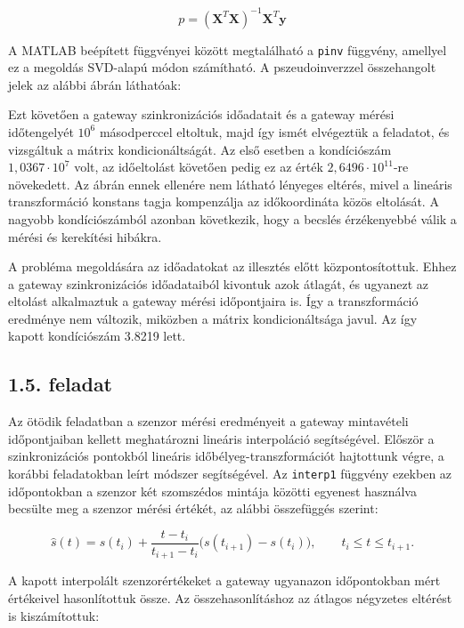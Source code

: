 \documentclass[12pt,a4paper]{article}
\newcommand{\feladat}[1]{%
\phantomsection
\subsection*{#1. feladat}%
\addcontentsline{toc}{subsection}{#1. feladat}%
}
\begin{document}
\begin{equation}
    p = (\textbf{X}^T\textbf{X})^{-1}\textbf{X}^T\textbf{y}
\end{equation}

A MATLAB beépített függvényei között megtalálható a \texttt{pinv} függvény, amellyel ez a megoldás SVD-alapú módon számítható. A pszeudoinverzzel összehangolt jelek az alábbi ábrán láthatóak:


Ezt követően a gateway szinkronizációs időadatait és a gateway mérési időtengelyét $10^6$ másodperccel eltoltuk, majd így ismét elvégeztük a feladatot, és vizsgáltuk a mátrix kondicionáltságát. Az első esetben a kondíciószám $1{,}0367 \cdot 10^7$ volt, az időeltolást követően pedig ez az érték $2{,}6496 \cdot 10^{11}$-re növekedett. Az ábrán ennek ellenére nem látható lényeges eltérés, mivel a lineáris transzformáció konstans tagja kompenzálja az időkoordináta közös eltolását. A nagyobb kondíciószámból azonban következik, hogy a becslés érzékenyebbé válik a mérési és kerekítési hibákra.

A probléma megoldására az időadatokat az illesztés előtt központosítottuk. Ehhez a gateway szinkronizációs időadataiból kivontuk azok átlagát, és ugyanezt az eltolást alkalmaztuk a gateway mérési időpontjaira is. Így a transzformáció eredménye nem változik, miközben a mátrix kondicionáltsága javul. Az így kapott kondíciószám 3.8219 lett.

\feladat{1.5}

Az ötödik feladatban a szenzor mérési eredményeit a gateway mintavételi időpontjaiban kellett meghatározni lineáris interpoláció segítségével. Először a szinkronizációs pontokból lineáris időbélyeg-transzformációt hajtottunk végre, a korábbi feladatokban leírt módszer segítségével.  Az \texttt{interp1} függvény ezekben az időpontokban a szenzor két szomszédos mintája közötti egyenest használva becsülte meg a szenzor mérési értékét, az alábbi összefüggés szerint:

\begin{equation}
\hat{s}(t) =
s(t_i) + \frac{t-t_i}{t_{i+1}-t_i}
\bigl(s(t_{i+1})-s(t_i)\bigr),
\qquad t_i \leq t \leq t_{i+1}.
\end{equation}

A kapott interpolált szenzorértékeket a gateway ugyanazon időpontokban mért értékeivel hasonlítottuk össze. Az összehasonlításhoz az átlagos négyzetes eltérést is kiszámítottuk:
\end{document}

